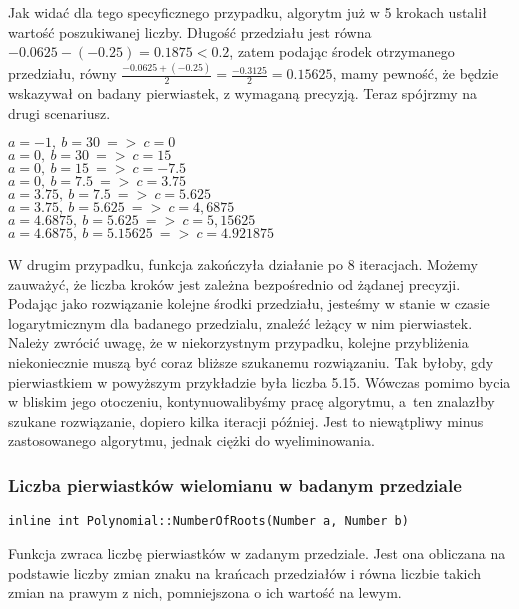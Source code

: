 Jak widać dla tego specyficznego przypadku, algorytm już w 5 krokach ustalił wartość poszukiwanej liczby. Długość przedziału jest równa $-0.0625-(-0.25)=0.1875<0.2$, zatem podając środek otrzymanego przedziału, równy $\frac{-0.0625+(-0.25)}{2}=\frac{-0.3125}{2}=0.15625$, mamy pewność, że będzie wskazywał on badany pierwiastek, z wymaganą precyzją. Teraz spójrzmy na drugi scenariusz.

\begin{example}
	$a = -1,\ b = 30\ =>\ c=0$ \\
	$a = 0,\ b = 30\ =>\ c=15$ \\
	$a = 0,\ b = 15\ =>\ c=-7.5$ \\
	$a = 0,\ b = 7.5\ =>\ c=3.75$ \\
	$a = 3.75,\ b = 7.5\ =>\ c=5.625$ \\
	$a = 3.75,\ b = 5.625\ =>\ c=4,6875$ \\
	$a = 4.6875,\ b = 5.625\ =>\ c=5,15625$ \\
	$a = 4.6875,\ b = 5.15625\ =>\ c=4.921875$
\end{example}

W drugim przypadku, funkcja zakończyła działanie po 8 iteracjach. Możemy zauważyć, że liczba kroków jest zależna bezpośrednio od żądanej precyzji. Podając jako rozwiązanie kolejne środki przedziału, jesteśmy w stanie w czasie logarytmicznym dla badanego przedzialu, znaleźć leżący w nim pierwiastek. Należy zwrócić uwagę, że w niekorzystnym przypadku, kolejne przybliżenia niekoniecznie muszą być coraz bliższe szukanemu rozwiązaniu. Tak byłoby, gdy pierwiastkiem w powyższym przykładzie była liczba 5.15. Wówczas pomimo bycia w bliskim jego otoczeniu, kontynuowalibyśmy pracę algorytmu, a~ten znalazłby szukane rozwiązanie, dopiero kilka iteracji później. Jest to niewątpliwy minus zastosowanego algorytmu, jednak ciężki do wyeliminowania.

\subsubsection{Liczba pierwiastków wielomianu w badanym przedziale}
\begin{lstlisting}
inline int Polynomial::NumberOfRoots(Number a, Number b)
\end{lstlisting}

Funkcja zwraca liczbę pierwiastków w zadanym przedziale. Jest ona obliczana na podstawie liczby zmian znaku na krańcach przedziałów i równa liczbie takich zmian na prawym z nich, pomniejszona o ich wartość na lewym.

